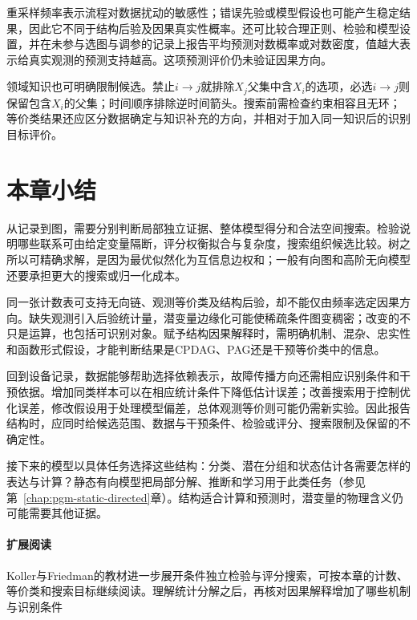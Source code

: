 重采样频率表示流程对数据扰动的敏感性；错误先验或模型假设也可能产生稳定结果，因此它不同于结构后验及因果真实性概率。还可比较合理正则、检验和模型设置，并在未参与选图与调参的记录上报告平均预测对数概率或对数密度，值越大表示给真实观测的预测支持越高。这项预测评价仍未验证因果方向。

领域知识也可明确限制候选。禁止$i\to j$就排除$X_j$父集中含$X_i$的选项，必选$i\to j$则保留包含$X_i$的父集；时间顺序排除逆时间箭头。搜索前需检查约束相容且无环；等价类结果还应区分数据确定与知识补充的方向，并相对于加入同一知识后的识别目标评价。

\section{本章小结}
\label{sec:pgm-structure-learning-summary}

从记录到图，需要分别判断局部独立证据、整体模型得分和合法空间搜索。检验说明哪些联系可由给定变量隔断，评分权衡拟合与复杂度，搜索组织候选比较。树之所以可精确求解，是因为最优似然化为互信息边权和；一般有向图和高阶无向模型还要承担更大的搜索或归一化成本。

同一张计数表可支持无向链、观测等价类及结构后验，却不能仅由频率选定因果方向。缺失观测引入后验统计量，潜变量边缘化可能使稀疏条件图变稠密；改变的不只是运算，也包括可识别对象。赋予结构因果解释时，需明确机制、混杂、忠实性和函数形式假设，才能判断结果是CPDAG、PAG还是干预等价类中的信息。

回到设备记录，数据能够帮助选择依赖表示，故障传播方向还需相应识别条件和干预依据。增加同类样本可以在相应统计条件下降低估计误差；改善搜索用于控制优化误差，修改假设用于处理模型偏差，总体观测等价则可能仍需新实验。因此报告结构时，应同时给候选范围、数据与干预条件、检验或评分、搜索限制及保留的不确定性。

接下来的模型以具体任务选择这些结构：分类、潜在分组和状态估计各需要怎样的表达与计算？静态有向模型把局部分解、推断和学习用于此类任务（参见第~\ref{chap:pgm-static-directed}章）。结构适合计算和预测时，潜变量的物理含义仍可能需要其他证据。

\paragraph{扩展阅读}
Koller与Friedman的教材进一步展开条件独立检验与评分搜索，可按本章的计数、等价类和搜索目标继续阅读。理解统计分解之后，再核对因果解释增加了哪些机制与识别条件
